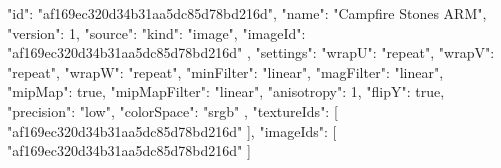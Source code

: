 {
  "id": "af169ec320d34b31aa5dc85d78bd216d",
  "name": "Campfire Stones ARM",
  "version": 1,
  "source": {
    "kind": "image",
    "imageId": "af169ec320d34b31aa5dc85d78bd216d"
  },
  "settings": {
    "wrapU": "repeat",
    "wrapV": "repeat",
    "wrapW": "repeat",
    "minFilter": "linear",
    "magFilter": "linear",
    "mipMap": true,
    "mipMapFilter": "linear",
    "anisotropy": 1,
    "flipY": true,
    "precision": "low",
    "colorSpace": "srgb"
  },
  "textureIds": [
    "af169ec320d34b31aa5dc85d78bd216d"
  ],
  "imageIds": [
    "af169ec320d34b31aa5dc85d78bd216d"
  ]
}
